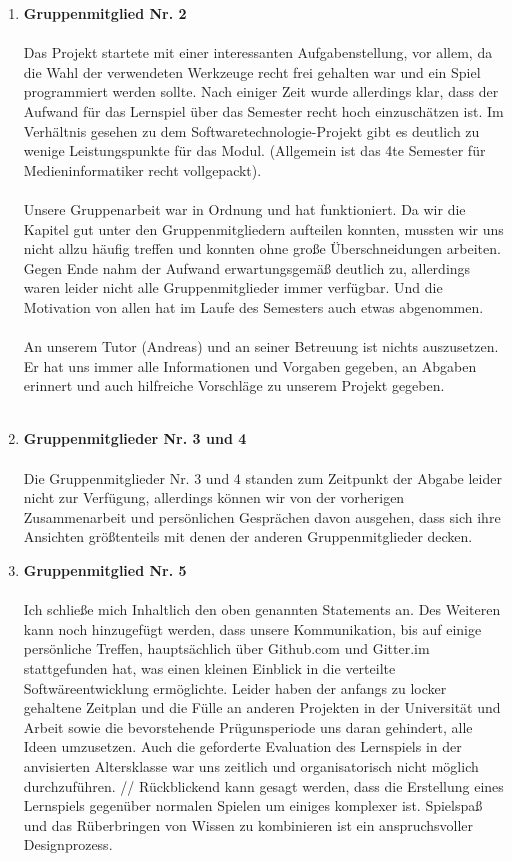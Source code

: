 \documentclass[a4paper]{article}
\begin{document}
\begin{enumerate}
    \item \textbf{Gruppenmitglied Nr. 2}\\
    \\
    Das Projekt startete mit einer interessanten Aufgabenstellung, vor allem, da die Wahl der verwendeten Werkzeuge recht frei gehalten war und ein Spiel programmiert werden sollte. Nach einiger Zeit wurde allerdings klar, dass der Aufwand für das Lernspiel über das Semester recht hoch einzuschätzen ist. Im Verhältnis gesehen zu dem Softwaretechnologie-Projekt gibt es deutlich zu wenige Leistungspunkte für das Modul. (Allgemein ist das 4te Semester für Medieninformatiker recht vollgepackt).\\
    \\
    Unsere Gruppenarbeit war in Ordnung und hat funktioniert. Da wir die Kapitel gut unter den Gruppenmitgliedern aufteilen konnten, mussten wir uns nicht allzu häufig treffen und konnten ohne große Überschneidungen arbeiten. Gegen Ende nahm der Aufwand erwartungsgemäß deutlich zu, allerdings waren leider nicht alle Gruppenmitglieder immer verfügbar. Und die Motivation von allen hat im Laufe des Semesters auch etwas abgenommen.\\
    \\
    An unserem Tutor (Andreas) und an seiner Betreuung ist nichts auszusetzen. Er hat uns immer alle Informationen und Vorgaben gegeben, an Abgaben erinnert und auch hilfreiche Vorschläge zu unserem Projekt gegeben.\\
    \\

    \item \textbf{Gruppenmitglieder Nr. 3 und 4}\\
    \\
    Die Gruppenmitglieder Nr. 3 und 4 standen zum Zeitpunkt der Abgabe leider nicht zur Verfügung, allerdings können wir von der vorherigen Zusammenarbeit und persönlichen Gesprächen davon ausgehen, dass sich ihre Ansichten größtenteils mit denen der anderen Gruppenmitglieder decken.
    \\

    \item \textbf{Gruppenmitglied Nr. 5}\\
    \\
    Ich schließe mich Inhaltlich den oben genannten Statements an. Des Weiteren kann noch hinzugefügt werden, dass unsere Kommunikation, bis auf einige persönliche Treffen, hauptsächlich über Github.com und Gitter.im stattgefunden hat, was einen kleinen Einblick in die verteilte Softwäreentwicklung ermöglichte. Leider haben der anfangs zu locker gehaltene Zeitplan und die Fülle an anderen Projekten in der Universität und Arbeit sowie die bevorstehende Prügunsperiode uns daran gehindert, alle Ideen umzusetzen. Auch die geforderte Evaluation des Lernspiels in der anvisierten Altersklasse war uns zeitlich und organisatorisch nicht möglich durchzuführen.
    //
    Rückblickend kann gesagt werden, dass die Erstellung eines Lernspiels gegenüber normalen Spielen um einiges komplexer ist. Spielspaß und das Rüberbringen von Wissen zu kombinieren ist ein anspruchsvoller Designprozess.
    \\


\end{enumerate}
\end{document}
